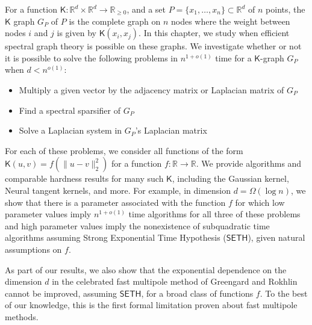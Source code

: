 For a function $\mathsf{K} : \mathbb{R}^{d} \times \mathbb{R}^{d} \to
\mathbb{R}_{\geq 0}$, and a set $P = \{ x_1, \ldots, x_n\} \subset
\mathbb{R}^d$ of $n$ points, the $\mathsf{K}$ graph $G_P$ of $P$ is the
complete graph on $n$ nodes where the weight between nodes $i$ and $j$
is given by $\mathsf{K}(x_i, x_j)$. In this chapter, we study when efficient spectral graph theory is possible on these graphs. We investigate whether or not it is possible to solve the following problems in $n^{1+o(1)}$ time for a $\mathsf{K}$-graph $G_P$ when $d < n^{o(1)}$:

\begin{itemize}
\item Multiply a given vector by the adjacency matrix or Laplacian matrix of $G_P$
\item Find a spectral sparsifier of $G_P$
\item Solve a Laplacian system in $G_P$'s Laplacian matrix
\end{itemize}
    
For each of these problems, we consider all functions of the form $\mathsf{K}(u,v) = f(\|u-v\|_2^2)$ for a function $f:\mathbb{R} \rightarrow \mathbb{R}$. We provide algorithms and comparable hardness results for many such $\mathsf{K}$, including the Gaussian kernel, Neural tangent kernels, and more. For example, in dimension $d = \Omega(\log n)$, we show that there is a parameter associated with the function $f$ for which low parameter values imply $n^{1+o(1)}$ time algorithms for all three of these problems and high parameter values imply the nonexistence of subquadratic time algorithms assuming Strong Exponential Time Hypothesis ($\mathsf{SETH}$), given natural assumptions on $f$.

As part of our results, we also show that the exponential dependence on the dimension $d$ in the celebrated fast multipole method of Greengard and Rokhlin cannot be improved, assuming $\mathsf{SETH}$, for a broad class of functions $f$. To the best of our knowledge, this is the first formal limitation proven about fast multipole methods. 


